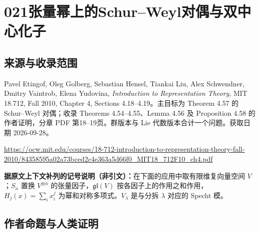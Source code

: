 \documentclass[UTF8,11pt]{ctexart}
\theoremstyle{definition}
\begin{document}
\section*{021\quad 张量幂上的Schur--Weyl对偶与双中心化子}
\subsection*{来源与收录范围}
Pavel Etingof, Oleg Golberg, Sebastian Hensel, Tiankai Liu, Alex Schwendner, Dmitry Vaintrob, Elena Yudovina, \emph{Introduction to Representation Theory}, MIT 18.712, Fall 2010, Chapter 4, Sections 4.18--4.19。主目标为 Theorem 4.57 的 Schur--Weyl 对偶；收录 Theorems 4.54--4.55、Lemma 4.56 及 Proposition 4.58 的作者证明，分章 PDF 第18--19页。群版本与 Lie 代数版本合计一个问题。获取日期 2026-09-28。
\par\url{https://ocw.mit.edu/courses/18-712-introduction-to-representation-theory-fall-2010/84358595a02a73bced2c4e363a5d66f0_MIT18_712F10_ch4.pdf}
\par\textbf{据原文上下文补列的记号说明（非引文）：}在下面的应用中取有限维复向量空间 $V$；$S_n$ 置换 $V^{\otimes n}$ 的张量因子，$\mathfrak{gl}(V)$ 按各因子上的作用之和作用，$H_j(x)=\sum_i x_i^j$ 为幂和对称多项式。$V_\lambda$ 是与分拆 $\lambda$ 对应的 Specht 模。
\subsection*{作者命题与人类证明}
\end{document}
